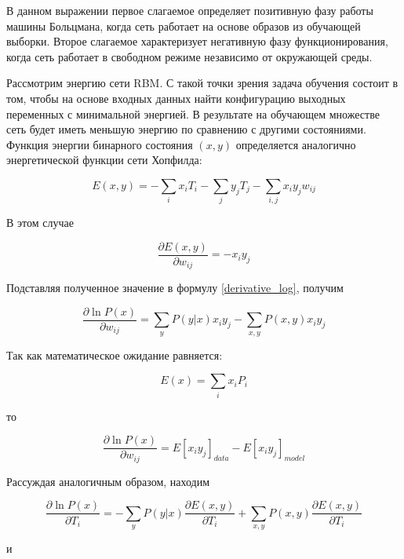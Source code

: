 В данном выражении первое слагаемое определяет позитивную фазу работы машины Больцмана, когда сеть работает на основе образов из обучающей выборки. Второе слагаемое характеризует негативную фазу функционирования, когда сеть работает в свободном режиме независимо от окружающей среды.

Рассмотрим энергию сети RBM. С такой точки зрения задача обучения состоит в том, чтобы на основе входных данных найти конфигурацию выходных переменных с минимальной энергией. В результате на обучающем множестве сеть будет иметь меньшую энергию по сравнению с другими состояниями. Функция энергии бинарного состояния $(x,y)$ определяется аналогично энергетической функции сети Хопфилда:

\begin{equation}
	E(x,y)=-\sum_i x_iT_i-\sum_j y_jT_j-\sum_{i,j} x_iy_jw_{ij}
\end{equation}

В этом случае

\begin{equation*}
	\frac{\partial E(x,y)}{\partial w_{ij}}=-x_iy_j 	
\end{equation*}

Подставляя полученное значение в формулу \ref{derivative_log}, получим

\begin{equation}
	\label{grad_weights}
	\frac{\partial \ln P(x)}{\partial w_{ij}}=\sum_y P(y \lvert x)x_i y_j-\sum_{x,y} P(x,y)x_iy_j
\end{equation}

Так как математическое ожидание равняется:

\begin{equation}
	\label{mean}
	E(x)=\sum_i x_iP_i
\end{equation}	  

то

\begin{equation*}
	\frac{\partial \ln P(x)}{\partial w_{ij}}=E\left[x_iy_j\right]_{data}-E\left[x_iy_j\right]_{model}
\end{equation*}

Рассуждая аналогичным образом, находим

\begin{equation*}
	\frac{\partial \ln P(x)}{\partial T_{i}}=-\sum_y P(y \lvert x)\frac{\partial E(x,y)}{\partial T_{i}} + \sum_{x,y} P(x,y)\frac{\partial E(x,y)}{\partial T_{i}}
\end{equation*}

и

